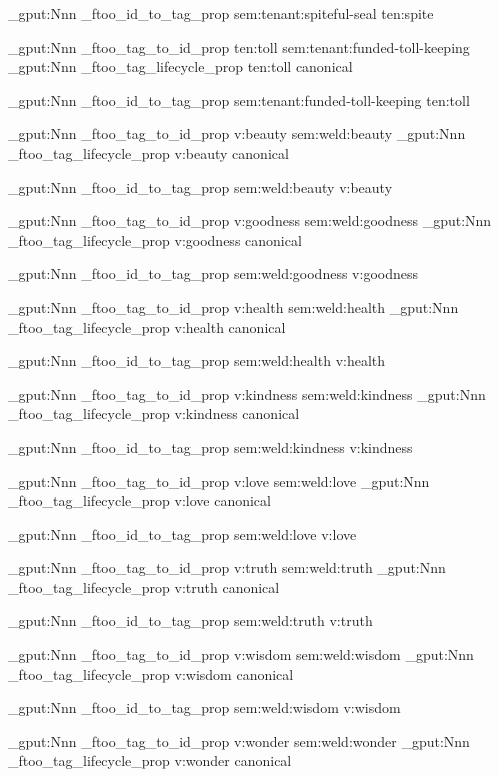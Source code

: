 \prop_gput:Nnn \g_ftoo_id_to_tag_prop { sem:tenant:spiteful-seal } { ten:spite }


\prop_gput:Nnn \g_ftoo_tag_to_id_prop { ten:toll } { sem:tenant:funded-toll-keeping }
\prop_gput:Nnn \g_ftoo_tag_lifecycle_prop { ten:toll } { canonical }

\prop_gput:Nnn \g_ftoo_id_to_tag_prop { sem:tenant:funded-toll-keeping } { ten:toll }


\prop_gput:Nnn \g_ftoo_tag_to_id_prop { v:beauty } { sem:weld:beauty }
\prop_gput:Nnn \g_ftoo_tag_lifecycle_prop { v:beauty } { canonical }

\prop_gput:Nnn \g_ftoo_id_to_tag_prop { sem:weld:beauty } { v:beauty }


\prop_gput:Nnn \g_ftoo_tag_to_id_prop { v:goodness } { sem:weld:goodness }
\prop_gput:Nnn \g_ftoo_tag_lifecycle_prop { v:goodness } { canonical }

\prop_gput:Nnn \g_ftoo_id_to_tag_prop { sem:weld:goodness } { v:goodness }


\prop_gput:Nnn \g_ftoo_tag_to_id_prop { v:health } { sem:weld:health }
\prop_gput:Nnn \g_ftoo_tag_lifecycle_prop { v:health } { canonical }

\prop_gput:Nnn \g_ftoo_id_to_tag_prop { sem:weld:health } { v:health }


\prop_gput:Nnn \g_ftoo_tag_to_id_prop { v:kindness } { sem:weld:kindness }
\prop_gput:Nnn \g_ftoo_tag_lifecycle_prop { v:kindness } { canonical }

\prop_gput:Nnn \g_ftoo_id_to_tag_prop { sem:weld:kindness } { v:kindness }


\prop_gput:Nnn \g_ftoo_tag_to_id_prop { v:love } { sem:weld:love }
\prop_gput:Nnn \g_ftoo_tag_lifecycle_prop { v:love } { canonical }

\prop_gput:Nnn \g_ftoo_id_to_tag_prop { sem:weld:love } { v:love }


\prop_gput:Nnn \g_ftoo_tag_to_id_prop { v:truth } { sem:weld:truth }
\prop_gput:Nnn \g_ftoo_tag_lifecycle_prop { v:truth } { canonical }

\prop_gput:Nnn \g_ftoo_id_to_tag_prop { sem:weld:truth } { v:truth }


\prop_gput:Nnn \g_ftoo_tag_to_id_prop { v:wisdom } { sem:weld:wisdom }
\prop_gput:Nnn \g_ftoo_tag_lifecycle_prop { v:wisdom } { canonical }

\prop_gput:Nnn \g_ftoo_id_to_tag_prop { sem:weld:wisdom } { v:wisdom }


\prop_gput:Nnn \g_ftoo_tag_to_id_prop { v:wonder } { sem:weld:wonder }
\prop_gput:Nnn \g_ftoo_tag_lifecycle_prop { v:wonder } { canonical }

